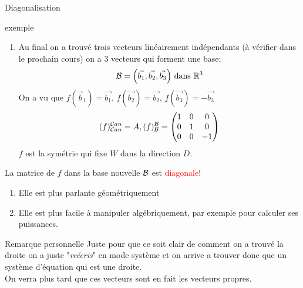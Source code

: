 \begin{parag}{Diagonalisation}
\begin{subparag}{exemple}
\begin{enumerate}
    \item Au final on a trouvé trois vecteurs linéairement indépendants (à vérifier dans le prochain cours) on a $3$ vecteurs qui forment une base;
    \[\bmath = \left(\vec{b_1}, \vec{b_2}, \vec{b_3} \right) \text{ dans } \mathbb{R}^3\]
    On a vu que $f(\vec{b}_1) = \vec{b_1}$, $f(\vec{b_2})= \vec{b_2}$, $f(\vec{b_3}) = -\vec{b_3}$\\
    \[(f)_{\mathcal{C} an}^{\mathcal{C} an} = A, (f)_{\mathcal{B}}^{\mathcal{B}} = \begin{pmatrix}
        1 & 0 & 0 \\
        0 & 1 & 0 \\
        0 & 0 & -1
    \end{pmatrix}\]
    $f$ est la symétrie qui fixe $W$ dans la direction $D$.
    \end{enumerate}
    La matrice de $f$ dans la base nouvelle $\mathcal{B}$ est \textcolor{red}{diagonale}!
    \begin{enumerate}
        \item Elle est plus parlante géométriquement
        \item Elle est plus facile à manipuler algébriquement, par exemple  pour calculer ses puissances.
    \end{enumerate}
    \end{subparag}
    \begin{subparag}{Remarque personnelle}
        Juste pour que ce soit clair de comment on a trouvé la droite on a juste "\textit{reécris}" en mode système et on arrive a trouver donc que un système d'équation qui est une droite.\\
        On verra plus tard que ces vecteurs sont en fait les vecteurs propres.
    \end{subparag}
\end{parag}


